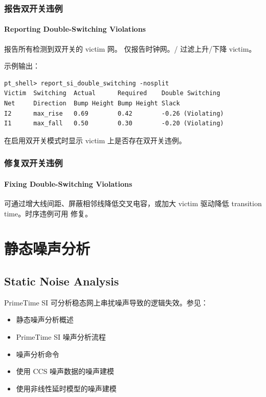 \subsubsection{报告双开关违例}
\paragraph*{Reporting Double-Switching Violations}

 报告所有检测到双开关的 victim 网。 仅报告时钟网。/ 过滤上升/下降 victim。

示例输出：
\begin{lstlisting}
pt_shell> report_si_double_switching -nosplit
Victim  Switching  Actual      Required    Double Switching
Net     Direction  Bump Height Bump Height Slack
I2      max_rise   0.69        0.42        -0.26 (Violating)
I1      max_fall   0.50        0.30        -0.20 (Violating)
\end{lstlisting}

 在启用双开关模式时显示 victim 上是否存在双开关违例。

\subsubsection{修复双开关违例}
\paragraph*{Fixing Double-Switching Violations}

可通过增大线间距、屏蔽相邻线降低交叉电容，或加大 victim 驱动降低 transition time。时序违例可用  修复。


\section{静态噪声分析}
\subsection*{Static Noise Analysis}

PrimeTime SI 可分析稳态网上串扰噪声导致的逻辑失效。参见：
\begin{itemize}
  \item 静态噪声分析概述
  \item PrimeTime SI 噪声分析流程
  \item 噪声分析命令
  \item 使用 CCS 噪声数据的噪声建模
  \item 使用非线性延时模型的噪声建模
\end{itemize}

